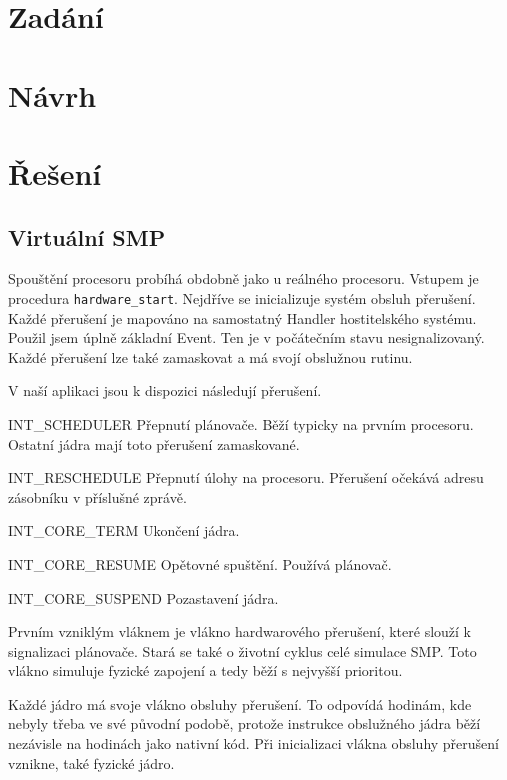 \documentclass[a4paper,12pt]{article}
\begin{document}
\section{Zadání}

\section{Návrh}

\section{Řešení}

\subsection{Virtuální SMP}
Spouštění procesoru probíhá obdobně jako u reálného procesoru. Vstupem je procedura
\verb+hardware_start+. Nejdříve se inicializuje
systém obsluh přerušení. Každé přerušení je mapováno na samostatný Handler
hostitelského systému. Použil jsem úplně základní Event. Ten je v počátečním stavu
nesignalizovaný. Každé přerušení lze také zamaskovat a má svojí obslužnou rutinu.

V naší aplikaci jsou k dispozici následují přerušení.

\begin{description}
\item{INT\_SCHEDULER} Přepnutí plánovače. Běží typicky na prvním procesoru. Ostatní
jádra mají toto přerušení zamaskované.
\item{INT\_RESCHEDULE} Přepnutí úlohy na procesoru. Přerušení očekává adresu
zásobníku v příslušné zprávě.
\item{INT\_CORE\_TERM} Ukončení jádra.
\item{INT\_CORE\_RESUME} Opětovné spuštění. Používá plánovač.
\item{INT\_CORE\_SUSPEND} Pozastavení jádra.
\end{description}

Prvním vzniklým vláknem je vlákno hardwarového přerušení, které slouží k signalizaci
plánovače. Stará se také o životní cyklus celé simulace SMP. Toto vlákno simuluje
fyzické zapojení a tedy běží s nejvyšší prioritou.

Každé jádro má svoje vlákno obsluhy přerušení. To odpovídá hodinám, kde nebyly třeba
ve své původní podobě, protože instrukce obslužného jádra běží nezávisle na hodinách
jako nativní kód. Při inicializaci vlákna obsluhy přerušení vznikne, také fyzické jádro.
\end{document}
